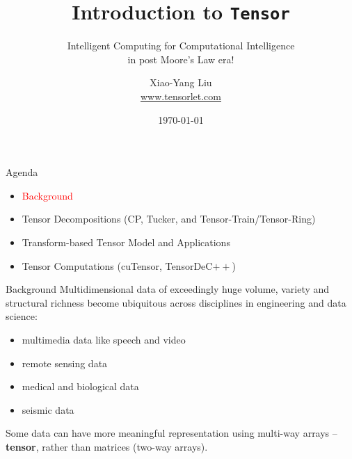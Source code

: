 \documentclass[t, 10pt, handout, aspectratio=169]{beamer}
\title[Introduction to Tensor]{Introduction to \texttt{Tensor}}
\subtitle{Intelligent Computing for Computational Intelligence \\
in post Moore’s Law era!}
\author[yanglet]{Xiao-Yang Liu\\
\url{www.tensorlet.com}}
\institute[CU]{Columbia University}
\date[\number\month/\number\day/\number\year]{\today}
\begin{document}
\begin{frame}
  \titlepage
\end{frame}

\begin{frame}{Agenda}
\begin{itemize}
    \large \item \textcolor{red}{Background}
    \large \item {Tensor Decompositions (CP, Tucker, and Tensor-Train/Tensor-Ring)}
    \large \item{Transform-based Tensor Model and Applications}
    \large \item{Tensor Computations (cuTensor, TensorDeC$++$)}
\end{itemize}
\end{frame}

\begin{frame}{Background}
\large Multidimensional data of exceedingly huge volume, variety and structural richness become ubiquitous across disciplines in engineering and data science:
\begin{itemize}
    \item multimedia data like speech and video
    \item remote sensing data
    \item medical and biological data
    \item seismic data
\end{itemize}
\margin
\large Some data can have more meaningful representation using multi-way arrays -- \textbf{tensor}, rather than matrices (two-way arrays).
\end{frame}
\end{document}
